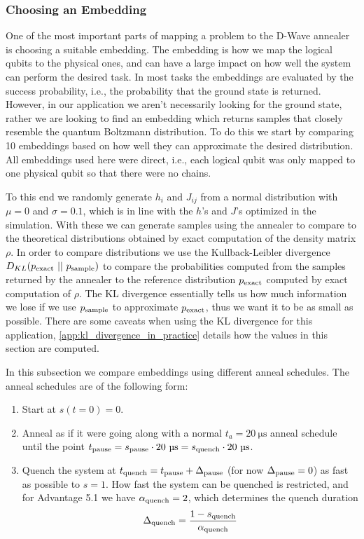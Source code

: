\subsubsection{Choosing an Embedding}
One of the most important parts of mapping a problem to the D-Wave annealer is choosing a suitable embedding.
The embedding is how we map the logical qubits to the physical ones, and can have a large impact on how well the system can perform the desired task.
In most tasks the embeddings are evaluated by the success probability, i.e., the probability that the ground state is returned.
However, in our application we aren't necessarily looking for the ground state, rather we are looking to find an embedding which returns samples that closely resemble the quantum Boltzmann distribution.
To do this we start by comparing 10 embeddings based on how well they can approximate the desired distribution.
All embeddings used here were direct, i.e., each logical qubit was only mapped to one physical qubit so that there were no chains.

To this end we randomly generate \( h_i \) and \( J_{ij} \) from a normal distribution with \( \mu = 0 \) and \( \sigma = 0.1 \), which is in line with the \( h \)'s and \( J \)'s optimized in the simulation.
With these we can generate samples using the annealer to compare to the theoretical distributions obtained by exact computation of the density matrix \( \rho \).
In order to compare distributions we use the Kullback-Leibler divergence \( D_{KL}(p_{\text{exact}} \ || \ p_{\text{sample}}) \) to compare the probabilities computed from the samples returned by the annealer to the reference distribution \( p_{\text{exact}} \) computed by exact computation of \( \rho \).
The KL divergence essentially tells us how much information we lose if we use \( p_{\text{sample}} \) to approximate \( p_{\text{exact}} \), thus we want it to be as small as possible.
There are some caveats when using the KL divergence for this application, \cref{app:kl_divergence_in_practice} details how the values in this section are computed.

In this subsection we compare embeddings using different anneal schedules.
The anneal schedules are of the following form:
\begin{enumerate}
    \item Start at \( s(t = 0) = 0 \).
    \item Anneal as if it were going along with a normal \( t_a = 20 \ \si{\micro\second} \) anneal schedule until the point \( \tpause = \spause \cdot 20 \ \si{\micro\second} = \squench \cdot 20 \ \si{\micro\second} \).
    \item Quench the system at \( t_{\text{quench}} = t_{\text{pause}} + \Delta_{\text{pause}} \) (for now \( \Delta_{\text{pause}} = 0 \)) as fast as possible to \( s = 1 \).
        How fast the system can be quenched is restricted, and for Advantage 5.1 we have \( \alpha_{\text{quench}} = 2 \), which determines the quench duration
        \[
            \Delta_{\text{quench}} = \frac{1 - s_{\text{quench}}}{\alpha_{\text{quench}}}
        \]
\end{enumerate}

